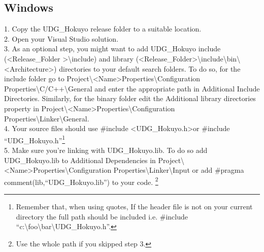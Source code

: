 \documentclass{book}
\begin{document}
\subsection{Windows}
1. Copy the UDG\_Hokuyo release folder to a suitable location.\\
2. Open your Visual Studio solution.\\
3. As an optional step, you might want to add UDG\_Hokuyo include (\textless{}Release\_Folder \textgreater\textbackslash{include}) and library (\textless{}Release\_Folder\textgreater\textbackslash{include}\textbackslash{bin}\textbackslash{\textless{}Architecture\textgreater}) directories to your default search folders. To do so, for the include folder go to Project\textbackslash{\textless{}Name\textgreater Properties}\textbackslash{Configuration Properties}\textbackslash{C/C++}\textbackslash{General} and enter the appropriate path in Additional Include Directories. Similarly, for the binary folder edit the Additional library directories property in  Project\textbackslash{\textless{}Name\textgreater{}Properties}\textbackslash{Configuration Properties}\textbackslash{Linker}\textbackslash{General}.\\
4. Your source files should use \#include \textless UDG\_Hokuyo.h\textgreater or \#include ``UDG\_Hokuyo.h''\footnote{Remember that, when using quotes, If the header file is not on your current directory the full path should be included i.e. \#include ``c:\textbackslash{}foo\textbackslash{}bar\textbackslash{}UDG\_Hokuyo.h''.}\\
5. Make sure you're linking with UDG\_Hokuyo.lib. To do so add UDG\_Hokuyo.lib to Additional Dependencies in Project\textbackslash{\textless{}Name\textgreater{}Properties}\textbackslash{Configuration Properties}\textbackslash{Linker}\textbackslash{Input} or add \#pragma comment(lib,``UDG\_Hokuyo.lib'') to your code. \footnote{Use the whole path if you skipped step 3.}\\
 
\end{document}
